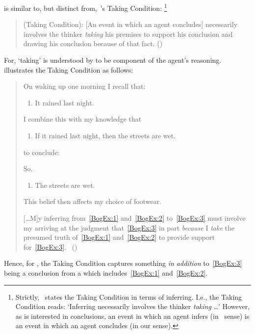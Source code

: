 \begin{note}
  \supportI{} is similar to, but distinct from,~\citeauthor{Boghossian:2014aa}'s Taking Condition:%
  \footnote{
    Strictly,~\citeauthor{Boghossian:2014aa} states the Taking Condition in terms of inferring.
    I.e., the Taking Condition reads: `Inferring necessarily involves the thinker \emph{taking} \dots'
    However, as \citeauthor{Boghossian:2008vf} is interested in conclusions, an event in which an agent infers (in~\citeauthor{Boghossian:2014aa} sense) is an event in which an agent concludes (in our sense).
  }

  \begin{quote}
    (Taking Condition):
    [An event in which an agent concludes] necessarily involves the thinker \emph{taking} his premises to support his conclusion and drawing his conclusion because of that fact.%
    \mbox{}\hfill\mbox{(\citeyear[5]{Boghossian:2014aa})}
  \end{quote}

  \noindent%
  For, `taking' is understood by \citeauthor{Boghossian:2014aa} to be component of the agent's reasoning.
  \citeauthor{Boghossian:2014aa} illustrates the Taking Condition as follows:
  \begin{quote}
    On waking up one morning I recall that:

    \begin{enumerate}[label=(\arabic*), ref=(\arabic*), series=BogEx]
    \item
      \label{BogEx:1}
      It rained last night.
    \end{enumerate}

    I combine this with my knowledge that

    \begin{enumerate}[label=(\arabic*), ref=(\arabic*), resume*=BogEx]
    \item
      \label{BogEx:2}
      If it rained last night, then the streets are wet.
    \end{enumerate}

    to conclude:

    So,

    \begin{enumerate}[label=(\arabic*), ref=(\arabic*), resume*=BogEx]
    \item
      \label{BogEx:3}
      The streets are wet.
    \end{enumerate}
    This belief then affects my choice of footwear.%

    [\dots M]y inferring from~\ref{BogEx:1} and~\ref{BogEx:2} to~\ref{BogEx:3} must involve my arriving at the judgment that~\ref{BogEx:3} in part \emph{because} I \emph{take} the presumed truth of~\ref{BogEx:1} and~\ref{BogEx:2} to provide support for~\ref{BogEx:3}.%
    \mbox{ }\hfill\mbox{(\citeyear[2,4]{Boghossian:2014aa})}
  \end{quote}
  Hence, for \citeauthor{Boghossian:2014aa}, the Taking Condition captures something \emph{in addition} to~\ref{BogEx:3} being a conclusion from a \pool{} which includes~\ref{BogEx:1} and~\ref{BogEx:2}.


\end{note}
